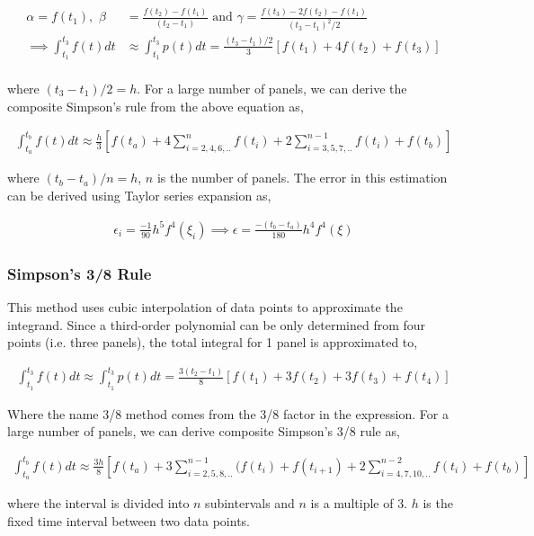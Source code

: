 \begin{align}
    \alpha = f(t_1),\,\,\beta &=\frac{f(t_2)-f(t_1)}{(t_2-t_1)}\text{ and }\gamma = \frac{f(t_3)-2f(t_2)-f(t_1)}{(t_3-t_1)^2/2}\\
    \implies \int_{t_1}^{t_3} f(t)dt &\approx \int_{t_1}^{t_3} p(t)dt = \frac{(t_3-t_1)/2}{3}[f(t_1)+4f(t_2)+f(t_3)]\\
\end{align}

where $(t_3-t_1)/2 = h$. For a large number of panels, we can derive the composite Simpson's rule from the above equation as, 

\begin{align}
    \int_{t_a}^{t_b} f(t)dt \approx \frac{h}{3}\left[f(t_a)+4\sum_{i=2,4,6,..}^{n} f(t_i)+2\sum_{i=3,5,7,..}^{n-1} f(t_i)+f(t_b)\right]
\end{align}

where $(t_b-t_a)/n = h$, $n$ is the number of panels. The error in this estimation can be derived using Taylor series expansion as,

\begin{align}
    \epsilon_i = \frac{-1}{90}h^5f^{4}(\xi_i) \implies \epsilon = \frac{-(t_b-t_a)}{180}h^4f^{4}(\xi)
\end{align}

\subsubsection{Simpson's 3/8 Rule}
This method uses cubic interpolation of data points to approximate the integrand. Since a third-order polynomial can be only determined from four points (i.e. three panels), the total integral for 1 panel is approximated to,

\begin{align}
    \int_{t_1}^{t_3} f(t)dt \approx \int_{t_1}^{t_3} p(t)dt = \frac{3(t_2-t_1)}{8}[f(t_1)+3f(t_2)+3f(t_3)+f(t_4)]
\end{align}

Where the name 3/8 method comes from the 3/8 factor in the expression. For a large number of panels, we can derive composite Simpson's 3/8 rule as,

\begin{align}
    \int_{t_a}^{t_b} f(t)dt \approx \frac{3h}{8}\left[f(t_a)+3\sum_{i=2,5,8,..}^{n-1} (f(t_i)+f(t_{i+1})+2\sum_{i=4,7,10,..}^{n-2} f(t_i)+f(t_b)\right]
\end{align}

where the interval is divided into $n$ subintervals and $n$ is a multiple of 3. $h$ is the fixed time interval between two data points.

